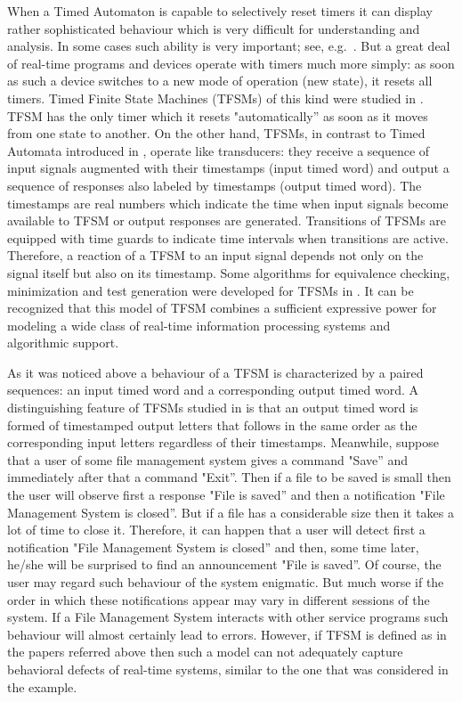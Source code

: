 \documentclass[conference]{IEEEtran}
\begin{document}
When a Timed Automaton is capable to selectively reset timers it can display rather sophisticated behaviour which is very difficult for understanding and analysis. In some cases such ability is very important; see, e.g.~\cite{fletcher}. But a great deal of real-time programs and devices operate with timers much more simply: as soon as such a device switches to a new mode of operation (new state), it resets all timers. Timed Finite State Machines (TFSMs) of this kind were studied in \cite{timed_fsm, merayo, timed_guard, tvar}. TFSM has the only timer which it resets "automatically'' as soon as it moves from one state to another. On the other hand, TFSMs, in contrast to Timed Automata introduced in \cite{alur}, operate like transducers: they receive a sequence of input signals augmented with their timestamps (input timed word) and output a sequence of responses also labeled by timestamps (output timed word). The timestamps are real numbers which indicate the time when input signals become available to TFSM or output responses are generated. Transitions of TFSMs are equipped with time guards to indicate time intervals when transitions are active. Therefore, a reaction of a TFSM to an input signal depends not only on the signal itself but also on its timestamp. Some algorithms for equivalence checking, minimization and test generation were developed for TFSMs in \cite{timed_fsm,timed_guard, tvar, zig}. It can be recognized that this model of TFSM combines a sufficient expressive power for modeling a wide class of real-time information processing systems and algorithmic support.   

As it was noticed above a behaviour of a TFSM is characterized by a paired sequences: an input timed word and a corresponding output timed word. A distinguishing feature of TFSMs studied in \cite{timed_fsm, merayo, timed_guard, tvar, zig} is that an output timed word is formed of timestamped output letters that follows in the same order as the corresponding input letters regardless of their timestamps. Meanwhile, suppose that a user of some file management system gives a command "Save'' and immediately after that a command "Exit''. Then if a file to be saved is small then the user will observe first a response "File is saved'' and then a notification "File Management System is closed''. But if a file has a considerable size then it takes a lot of time to close it. Therefore, it can happen that a user will detect  first a notification "File Management System is closed'' and then, some time later, he/she will be surprised to find an announcement "File  is saved''. Of course, the user may regard such behaviour of the system enigmatic. But much worse if the order in which these notifications appear may vary in different sessions of the system. If a File Management System interacts with other service programs such behaviour will almost certainly lead to errors. However, if TFSM is defined as in the papers referred above then such a model can not adequately capture behavioral defects of real-time systems, similar to the one that was considered in the example.   
\end{document}
